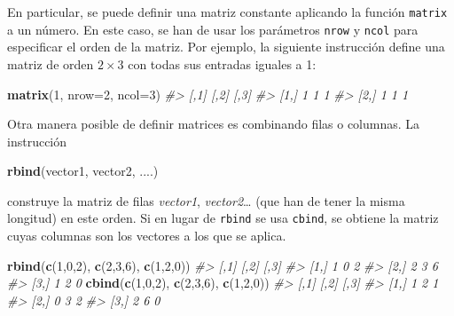 \documentclass[
]{book}
\newenvironment{Shaded}{\begin{snugshade}}{\end{snugshade}}
\newcommand{\CommentTok}[1]{\textcolor[rgb]{0.56,0.35,0.01}{\textit{#1}}}
\newcommand{\DataTypeTok}[1]{\textcolor[rgb]{0.13,0.29,0.53}{#1}}
\newcommand{\DecValTok}[1]{\textcolor[rgb]{0.00,0.00,0.81}{#1}}
\newcommand{\KeywordTok}[1]{\textcolor[rgb]{0.13,0.29,0.53}{\textbf{#1}}}
\newcommand{\NormalTok}[1]{#1}
\theoremstyle{definition}
\theoremstyle{definition}
\theoremstyle{definition}
\theoremstyle{remark}
\begin{document}
En particular, se puede definir una matriz constante aplicando la función \texttt{matrix} a un número. En este caso, se han de usar los parámetros \texttt{nrow} y \texttt{ncol} para especificar el orden de la matriz. Por ejemplo, la siguiente instrucción define una matriz de orden \(2\times 3\) con todas sus entradas iguales a 1:

\begin{Shaded}
\begin{Highlighting}[]
\KeywordTok{matrix}\NormalTok{(}\DecValTok{1}\NormalTok{, }\DataTypeTok{nrow=}\DecValTok{2}\NormalTok{, }\DataTypeTok{ncol=}\DecValTok{3}\NormalTok{) }
\CommentTok{\#\textgreater{}      [,1] [,2] [,3]}
\CommentTok{\#\textgreater{} [1,]    1    1    1}
\CommentTok{\#\textgreater{} [2,]    1    1    1}
\end{Highlighting}
\end{Shaded}

Otra manera posible de definir matrices es combinando filas o columnas. La instrucción

\begin{Shaded}
\begin{Highlighting}[]
\KeywordTok{rbind}\NormalTok{(vector1, vector2, ....)}
\end{Highlighting}
\end{Shaded}

construye la matriz de filas \emph{vector1}, \emph{vector2}\ldots{} (que han de tener la misma longitud) en este orden. Si en lugar de \texttt{rbind} se usa \texttt{cbind}, se obtiene la matriz cuyas columnas son los vectores a los que se aplica.

\begin{Shaded}
\begin{Highlighting}[]
\KeywordTok{rbind}\NormalTok{(}\KeywordTok{c}\NormalTok{(}\DecValTok{1}\NormalTok{,}\DecValTok{0}\NormalTok{,}\DecValTok{2}\NormalTok{), }\KeywordTok{c}\NormalTok{(}\DecValTok{2}\NormalTok{,}\DecValTok{3}\NormalTok{,}\DecValTok{6}\NormalTok{), }\KeywordTok{c}\NormalTok{(}\DecValTok{1}\NormalTok{,}\DecValTok{2}\NormalTok{,}\DecValTok{0}\NormalTok{))}
\CommentTok{\#\textgreater{}      [,1] [,2] [,3]}
\CommentTok{\#\textgreater{} [1,]    1    0    2}
\CommentTok{\#\textgreater{} [2,]    2    3    6}
\CommentTok{\#\textgreater{} [3,]    1    2    0}
\KeywordTok{cbind}\NormalTok{(}\KeywordTok{c}\NormalTok{(}\DecValTok{1}\NormalTok{,}\DecValTok{0}\NormalTok{,}\DecValTok{2}\NormalTok{), }\KeywordTok{c}\NormalTok{(}\DecValTok{2}\NormalTok{,}\DecValTok{3}\NormalTok{,}\DecValTok{6}\NormalTok{), }\KeywordTok{c}\NormalTok{(}\DecValTok{1}\NormalTok{,}\DecValTok{2}\NormalTok{,}\DecValTok{0}\NormalTok{))}
\CommentTok{\#\textgreater{}      [,1] [,2] [,3]}
\CommentTok{\#\textgreater{} [1,]    1    2    1}
\CommentTok{\#\textgreater{} [2,]    0    3    2}
\CommentTok{\#\textgreater{} [3,]    2    6    0}
\end{Highlighting}
\end{Shaded}
\end{document}
